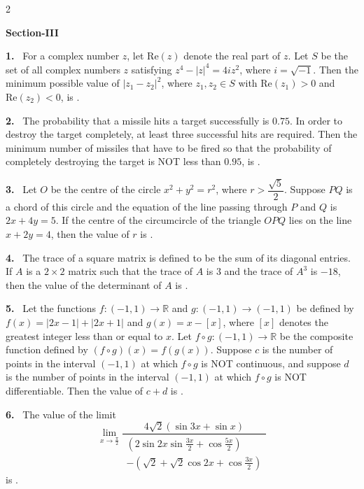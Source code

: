 \documentclass[10pt]{extarticle}
\newcommand{\sect}[1]{\par\smallskip\noindent\textbf{#1}\par}
\newcommand{\qn}[1]{\par\smallskip\noindent\textbf{#1.}~}
\begin{document}
\begin{multicols}{2}
\sect{Section-III}
\qn{1} For a complex number $z$, let $\mathrm{Re}(z)$ denote the real part of $z$. Let $S$ be the set of all complex numbers $z$ satisfying $z^4-|z|^4=4iz^2$, where $i=\sqrt{-1}$. Then the minimum possible value of $|z_1-z_2|^2$, where $z_1,z_2\in S$ with $\mathrm{Re}(z_1)>0$ and $\mathrm{Re}(z_2)<0$, is \underline{\hspace{2cm}}.
\qn{2} The probability that a missile hits a target successfully is $0.75$. In order to destroy the target completely, at least three successful hits are required. Then the minimum number of missiles that have to be fired so that the probability of completely destroying the target is NOT less than $0.95$, is \underline{\hspace{2cm}}.
\qn{3} Let $O$ be the centre of the circle $x^2+y^2=r^2$, where $r>\dfrac{\sqrt5}{2}$. Suppose $PQ$ is a chord of this circle and the equation of the line passing through $P$ and $Q$ is $2x+4y=5$. If the centre of the circumcircle of the triangle $OPQ$ lies on the line $x+2y=4$, then the value of $r$ is \underline{\hspace{2cm}}.
\qn{4} The trace of a square matrix is defined to be the sum of its diagonal entries. If $A$ is a $2\times2$ matrix such that the trace of $A$ is $3$ and the trace of $A^3$ is $-18$, then the value of the determinant of $A$ is \underline{\hspace{2cm}}.
\qn{5} Let the functions $f:(-1,1)\to\mathbb R$ and $g:(-1,1)\to(-1,1)$ be defined by $f(x)=|2x-1|+|2x+1|$ and $g(x)=x-[x]$, where $[x]$ denotes the greatest integer less than or equal to $x$. Let $f\circ g:(-1,1)\to\mathbb R$ be the composite function defined by $(f\circ g)(x)=f(g(x))$. Suppose $c$ is the number of points in the interval $(-1,1)$ at which $f\circ g$ is NOT continuous, and suppose $d$ is the number of points in the interval $(-1,1)$ at which $f\circ g$ is NOT differentiable. Then the value of $c+d$ is \underline{\hspace{2cm}}.
\qn{6} The value of the limit
\[\lim_{x\to\frac\pi2}\frac{4\sqrt2(\sin3x+\sin x)}{\begin{gathered}\left(2\sin2x\sin\tfrac{3x}2+\cos\tfrac{5x}2\right)\\-\left(\sqrt2+\sqrt2\cos2x+\cos\tfrac{3x}2\right)\end{gathered}}\]
is \underline{\hspace{2cm}}.
\end{multicols}
\end{document}

